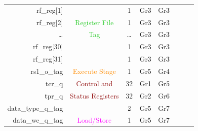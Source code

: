 \begin{table}[t]
\begin{tabular}{@{}rccccccc@{}}
        rf\_reg[1]                      &                                       & 1      & Gr3                         & Gr3                            &                             &                             &                             \\
        rf\_reg[2]                      & \textcolor{LimeGreen}{Register File}  & 1      & Gr3                         & Gr3                            &                             &                             &                             \\
        \ldots                          & \textcolor{LimeGreen}{Tag}            & \ldots & Gr3                         & Gr3                            &                             &                             &                             \\
        rf\_reg[30]                     &                                       & 1      & Gr3                         & Gr3                            &                             &                             &                             \\
        rf\_reg[31]                     &                                       & 1      & Gr3                         & Gr3                            &                             &                             &                             \\\hdashline
        rs1\_o\_tag                     & \textcolor{DarkOrange}{Execute Stage} & 1      & Gr5                         & Gr4                            &                             &                             &                             \\\hdashline
        tcr\_q                          & \textcolor{DarkRed}{Control and}      & 32     & Gr1                         & Gr5                            &                             &                             &                             \\
        tpr\_q                          & \textcolor{DarkRed}{Status Registers} & 32     & Gr2                         & Gr6                            &                             &                             &                             \\\hdashline
        data\_type\_q\_tag              &                                       & 2      & Gr5                         & Gr7                            &                             &                             &                             \\
        data\_we\_q\_tag                & \textcolor{magenta}{Load/Store}       & 1      & Gr5                         & Gr7                            &                             &                             &                             \\

\end{tabular}
\end{table}
